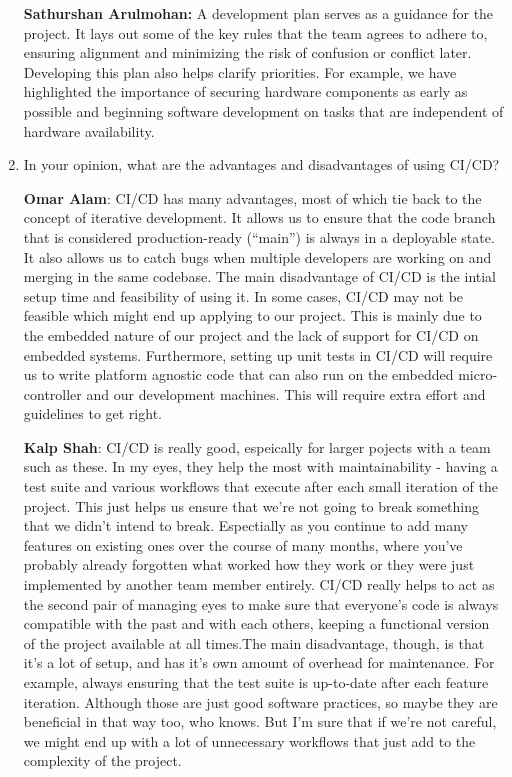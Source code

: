 \documentclass{article}
\begin{document}
\begin{enumerate}
    \textbf{Sathurshan Arulmohan:} A development plan serves as a guidance for
    the project. It lays out some of the key rules that the team agrees to
    adhere to, ensuring alignment and minimizing the risk of confusion or
    conflict later. Developing this plan also helps clarify priorities. For
    example, we have highlighted the importance of securing hardware components
    as early as possible and beginning software development on tasks that are
    independent of hardware availability.

    \item In your opinion, what are the advantages and disadvantages of using
    CI/CD?

    \textbf{Omar Alam}: CI/CD has many advantages, most of which tie back to the
    concept of iterative development. It allows us to ensure that the code
    branch that is considered production-ready (``main'') is always in a
    deployable state. It also allows us to catch bugs when multiple developers
    are working on and merging in the same codebase. The main disadvantage of
    CI/CD is the intial setup time and feasibility of using it. In some cases,
    CI/CD may not be feasible which might end up applying to our project. This
    is mainly due to the embedded nature of our project and the lack of support
    for CI/CD on embedded systems. Furthermore, setting up unit tests in CI/CD
    will require us to write platform agnostic code that can also run on the
    embedded micro-controller and our development machines. This will require
    extra effort and guidelines to get right.

    \textbf{Kalp Shah}: CI/CD is really good, espeically for larger pojects with
    a team such as these. In my eyes, they help the most with maintainability -
    having a test suite and various workflows that execute after each small
    iteration of the project. This just helps us ensure that we're not going to
    break something that we didn't intend to break. Espectially as you continue
    to add many features on existing ones over the course of many months, where
    you've probably already forgotten what worked how they work or they were
    just implemented by another team member entirely. CI/CD really helps to act
    as the second pair of managing eyes to make sure that everyone's code is
    always compatible with the past and with each others, keeping a functional
    version of the project available at all times.The main disadvantage, though,
    is that it's a lot of setup, and has it's own amount of overhead for
    maintenance. For example, always ensuring that the test suite is up-to-date
    after each feature iteration. Although those are just good software
    practices, so maybe they are beneficial in that way too, who knows. But I'm
    sure that if we're not careful, we might end up with a lot of unnecessary
    workflows that just add to the complexity of the project.
    

\end{enumerate}
\end{document}

